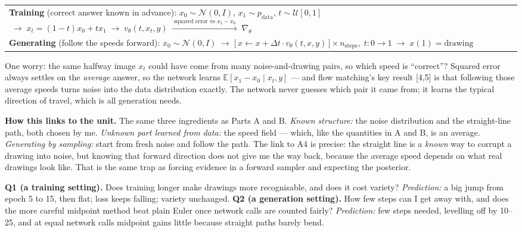 \documentclass[12pt,a4paper]{article}
\begin{document}
\begin{center}\small
\begin{tabular}{@{}l@{}}
\hline
\textbf{Training} (correct answer known in advance): \;
$x_0\sim\mathcal{N}(0,I)$, $x_1\sim p_{\text{data}}$, $t\sim\mathcal{U}[0,1]$
$\;\to\;x_t=(1{-}t)x_0{+}tx_1\;\to\;v_\theta(t,x_t,y)\;\xrightarrow{\ \text{squared error vs }x_1-x_0\ }\;\nabla_\theta$\\
\textbf{Generating} (follow the speeds forward): \;
$x_0\sim\mathcal{N}(0,I)\;\to\;\big[\,x\leftarrow x+\Delta t\cdot v_\theta(t,x,y)\,\big]\times n_{\text{steps}},\; t:0\to1\;\to\;x(1)=\text{drawing}$\\
\hline
\end{tabular}
\end{center}

One worry: the same halfway image $x_t$ could have come from many noise-and-drawing pairs, so which
speed is ``correct''? Squared error always settles on the \emph{average} answer, so the network learns
$\mathbb{E}[x_1-x_0\mid x_t,y]$ --- and flow matching's key result [4,5] is that following those average
speeds turns noise into the data distribution exactly. The network never guesses which pair it came
from; it learns the typical direction of travel, which is all generation needs.

\textbf{How this links to the unit.} The same three ingredients as Parts A and B. \emph{Known
structure:} the noise distribution and the straight-line path, both chosen by me. \emph{Unknown part
learned from data:} the speed field --- which, like the quantities in A and B, is an average.
\emph{Generating by sampling:} start from fresh noise and follow the path. The link to A4 is precise:
the straight line is a \emph{known} way to corrupt a drawing into noise, but knowing that forward
direction does not give me the way back, because the average speed depends on what real drawings look
like. That is the same trap as forcing evidence in a forward sampler and expecting the posterior.

\textbf{Q1 (a training setting).} Does training longer make drawings more recognisable, and does it cost
variety? \emph{Prediction:} a big jump from epoch 5 to 15, then flat; loss keeps falling; variety unchanged.
\textbf{Q2 (a generation setting).} How few steps can I get away with, and does the more careful midpoint
method beat plain Euler once network calls are counted fairly? \emph{Prediction:} few steps needed, levelling
off by 10--25, and at equal network calls midpoint gains little because straight paths barely bend.
\end{document}
